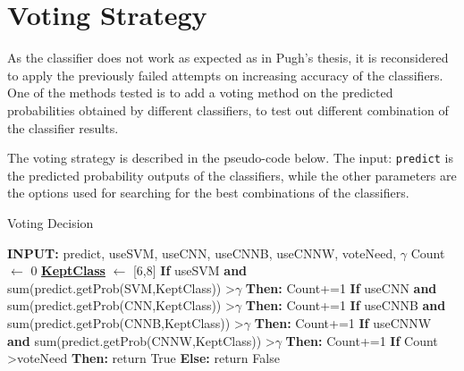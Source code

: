 \documentclass[bsc,logo,twoside,fullspacing,parskip]{infthesis}
\begin{document}



\section{Voting Strategy}
\label{sec:voting}

As the classifier does not work as expected as in Pugh's thesis, it is reconsidered to apply the previously failed attempts on increasing accuracy of the classifiers.
One of the methods tested is to add a voting method on the predicted probabilities obtained by different classifiers, to test out different combination of the classifier results.

The voting strategy is described in the pseudo-code below. 
The input: {\tt predict} is the predicted probability outputs of the classifiers, while the other parameters are the options used for searching for the best combinations of the classifiers. 

\begin{algorithm}
\caption{Voting Decision}
\begin{algorithmic}
\STATE \textbf{INPUT:} predict, useSVM, useCNN, useCNNB, useCNNW, voteNeed, $\gamma$
\STATE Count $\leftarrow$ 0
\STATE \underline{\textbf{KeptClass}} $\leftarrow$ [6,8]
\STATE \textbf{If} useSVM \textbf{and} sum(predict.getProb(SVM,KeptClass)) \textgreater  $\gamma$ \textbf{ Then:} Count+=1
\STATE \textbf{If} useCNN \textbf{and} sum(predict.getProb(CNN,KeptClass)) \textgreater  $\gamma$ \textbf{ Then:} Count+=1
\STATE \textbf{If} useCNNB \textbf{and} sum(predict.getProb(CNNB,KeptClass)) \textgreater  $\gamma$ \textbf{ Then:} Count+=1
\STATE \textbf{If} useCNNW \textbf{and} sum(predict.getProb(CNNW,KeptClass)) \textgreater  $\gamma$ \textbf{ Then:} Count+=1
\STATE \textbf{If} Count \textgreater voteNeed \textbf{ Then:} return True \textbf{ Else:} return False
\end{algorithmic} 
\end{algorithm}
\end{document}
